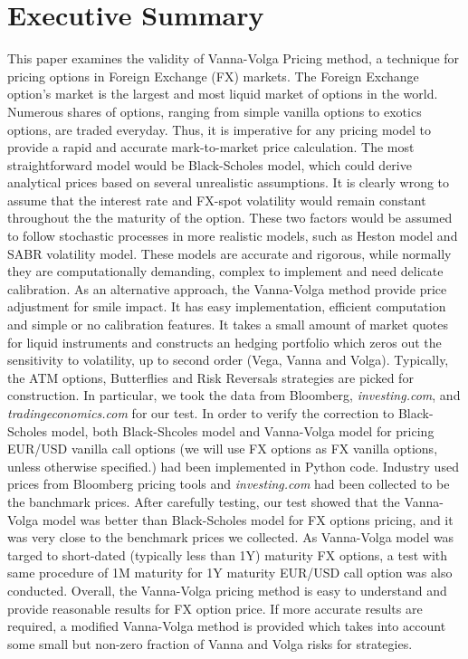 \chapter{Executive Summary}
This paper examines the validity of Vanna-Volga Pricing method, a technique for pricing options in Foreign Exchange (FX) markets. 
\newline
\newline
The Foreign Exchange option's market is the largest and most liquid market of options in the world. Numerous shares of options, ranging from simple vanilla options to exotics options, are traded everyday. Thus, it is imperative for any pricing model to provide a rapid and accurate mark-to-market price calculation.
\newline
\newline
The most straightforward model would be Black-Scholes model, which could derive analytical prices based on several unrealistic assumptions. It is clearly wrong to assume that the interest rate and FX-spot volatility would remain constant throughout the the maturity of the option. These two factors would be assumed to follow stochastic processes in more realistic models, such as Heston model and SABR volatility model. These models are accurate and rigorous, while normally they are computationally demanding, complex to implement and need delicate calibration. 
\newline
\newline
As an alternative approach, the Vanna-Volga method provide price adjustment for smile impact. It has easy implementation, efficient computation and simple or no calibration features. It takes a small amount of market quotes for liquid instruments and constructs an hedging portfolio which zeros out the sensitivity to volatility, up to second order (Vega, Vanna and Volga). Typically, the ATM options, Butterflies and Risk Reversals strategies are picked for construction. 
\newline
\newline
In particular, we took the data from Bloomberg, \textit{investing.com}, and \textit{tradingeconomics.com} for our test. In order to verify the correction to Black-Scholes model, both Black-Shcoles model and Vanna-Volga model for pricing EUR/USD vanilla call options (we will use FX options as FX vanilla options, unless otherwise specified.) had been implemented in Python code. Industry used prices from Bloomberg pricing tools and \textit{investing.com} had been collected to be the banchmark prices. After carefully testing, our test showed that the Vanna-Volga model was better than Black-Scholes model for FX options pricing, and it was very close to the benchmark prices we collected. As Vanna-Volga model was targed to short-dated (typically less than 1Y) maturity FX options, a test with same procedure of 1M maturity for 1Y maturity EUR/USD call option was also conducted.
\newline
\newline
Overall, the Vanna-Volga pricing method is easy to understand and provide reasonable results for FX option price. If more accurate results are required, a modified Vanna-Volga method is provided which takes into account some small but non-zero fraction of Vanna and Volga risks for strategies.